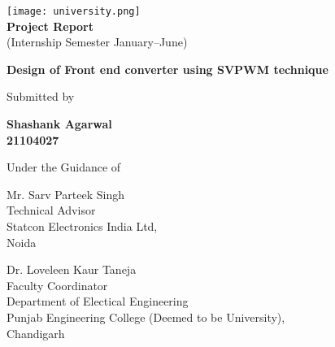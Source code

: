 \begin{titlepage}
    \begin{center}
        \texttt{[image: university.png]}\\
        {\textbf{Project Report}}\\
        \vspace*{0.2cm}
        (Internship Semester January--June)

        \vspace*{3cm}
        {\Large\textbf {Design of Front end converter using SVPWM technique}}

        \vfill
        Submitted by

        \vfill
        \textbf{
        Shashank Agarwal\\
        21104027
        }

        \vfill
        Under the Guidance of
    \end{center}
    \vfill

    \noindent
    \begin{minipage}[t]{0.5\textwidth}
        \raggedright
        Mr. Sarv Parteek Singh\\
        Technical Advisor\\
        Statcon Electronics India Ltd,\\
        Noida
    \end{minipage}
    \hfill
    \begin{minipage}[t]{0.5\textwidth}
        \raggedleft
        Dr. Loveleen Kaur Taneja\\
        Faculty Coordinator\\
        Department of Electical Engineering\\
        Punjab Engineering College (Deemed to be University),\\
        Chandigarh
    \end{minipage}
\end{titlepage}